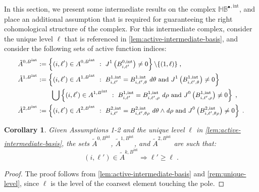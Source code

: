 \documentclass[10pt]{article}
\newcommand{\vSpace}[1]{\mathbb{#1}}
\newcommand{\complex}[1]{\mathit{\vSpace{#1}^\bullet}}
\newcommand{\cU}{\theta}
\newcommand{\cV}{\rho}
\newcommand{\dcU}{\mathit{d\cU}}
\newcommand{\dcV}{\mathit{d\cV}}
\newcommand{\bsp}{B}
\newcommand{\jet}[2]{J^{#1}\left(#2\right)}
\newcommand{\tint}{\mathrm{int}}
\newcommand{\hintComplex}{\complex{H\bsp}^{,\tint}}
\newcommand{\activeS}[2]{A^{#1}_{#2}}
\newcommand{\ractiveS}[2]{\tilde{A}^{#1}_{#2}}
\theoremstyle{plain}
\newtheorem{corollary}{Corollary}[section]
\theoremstyle{definition}
\theoremstyle{remark}
\begin{document}
In this section, we present some intermediate results on the complex $\hintComplex$, and place an additional assumption that is required for guaranteeing the right cohomological structure of the complex.
For this intermediate complex, consider the unique level $\ell$ that is referenced in \cref{lem:active-intermediate-basis}, and consider the following sets of active function indices:
\begin{equation}\label{eq:reduced-active-sets}
    \small
    \begin{split}
        \ractiveS{0,\bsp^\tint}{} &:= \left\{
            (i,\ell') \in \activeS{0,\bsp^\tint}{} ~:~ \jet{1}{\bsp^{0,\tint}_{i,\ell'}} \neq 0
        \right\}\backslash \{ (1,\ell) \}\;,\\
        \ractiveS{1,\bsp^\tint}{} &:= \left\{
            (i,\ell') \in \activeS{1,\bsp^\tint}{} ~:~
            \bsp^{1,\tint}_{i,\ell'} = \bsp^{1,\tint}_{i,\ell',\cU}\;\dcU
            \text{ and }
            \jet{1}{\bsp^{1,\tint}_{i,\ell',\cU}} \neq 0
        \right\} \\
        &\qquad\bigcup
        \left\{
            (i,\ell') \in \activeS{1,\bsp^\tint}{} ~:~
            \bsp^{1,\tint}_{i,\ell'} = \bsp^{1,\tint}_{i,\ell',\cV}\;\dcV
            \text{ and }
            \jet{0}{\bsp^{1,\tint}_{i,\ell',\cV}} \neq 0
        \right\}\;,\\
        \ractiveS{2,\bsp^\tint}{} &:= \left\{
            (i,\ell') \in \activeS{2,\bsp^\tint}{} ~:~
            \bsp^{2,\tint}_{i,\ell'} = \bsp^{2,\tint}_{i,\ell',\cU\cV}\;\dcU\wedge\dcV
            \text{ and }
            \jet{0}{\bsp^{2,\tint}_{i,\ell',\cU\cV}} \neq 0
        \right\}\;.
    \end{split}
\end{equation}

\begin{corollary}\label{cor:reduced-intermediate-basis}
    Given Assumptions 1-2 and the unique level $\ell$ in \cref{lem:active-intermediate-basis}, the sets $\ractiveS{0,\bsp^\tint}{}$, $\ractiveS{1,\bsp^\tint}{}$, and $\ractiveS{2,\bsp^\tint}{}$ are such that:
    \begin{equation*}
        (i, \ell') \in \ractiveS{k,\bsp^\tint}{} \Longrightarrow \ell' \geq \ell\;.
    \end{equation*}
\end{corollary}
\begin{proof}
    The proof follows from \cref{lem:active-intermediate-basis} and \cref{rem:unique-level}, since $\ell$ is the level of the coarsest element touching the pole.
\end{proof}
\end{document}
